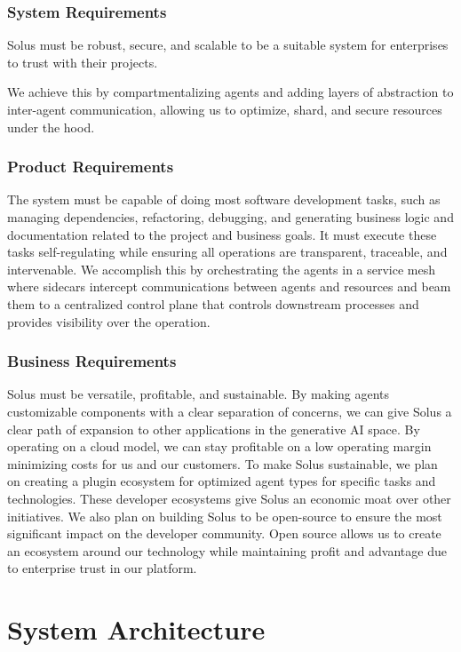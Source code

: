 \documentclass[a4paper,twocolumn,11pt]{quantumarticle}
\begin{document}
\subsubsection{System Requirements}
Solus must be robust, secure, and scalable to be a suitable system for enterprises to trust with their projects.

We achieve this by compartmentalizing agents and adding layers of abstraction to inter-agent communication, allowing us to optimize, shard, and secure resources under the hood.

\subsubsection{Product Requirements}
The system must be capable of doing most software development tasks, such as managing dependencies, refactoring, debugging, and generating business logic and documentation related to the project and business goals. It must execute these tasks self-regulating while ensuring all operations are transparent, traceable, and intervenable. We accomplish this by orchestrating the agents in a service mesh where sidecars intercept communications between agents and resources and beam them to a centralized control plane that controls downstream processes and provides visibility over the operation.

\subsubsection{Business Requirements}
Solus must be versatile, profitable, and sustainable. By making agents customizable components with a clear separation of concerns, we can give Solus a clear path of expansion to other applications in the generative AI space. By operating on a cloud model, we can stay profitable on a low operating margin minimizing costs for us and our customers. To make Solus sustainable, we plan on creating a plugin ecosystem for optimized agent types for specific tasks and technologies. These developer ecosystems give Solus an economic moat over other initiatives. We also plan on building Solus to be open-source to ensure the most significant impact on the developer community. Open source allows us to create an ecosystem around our technology while maintaining profit and advantage due to enterprise trust in our platform.

\section{System Architecture}
\end{document}
